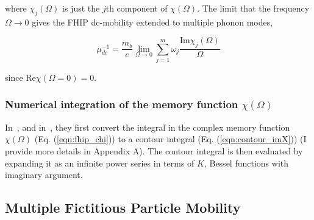 where $\chi_j(\Omega)$ is just the $j$th component of $\chi(\Omega)$. The limit that the frequency $\Omega \rightarrow 0$ gives the FHIP dc-mobility extended to multiple phonon modes,

\begin{equation}
    \mu^{-1}_{dc} = \frac{m_b}{e}\lim_{\Omega \rightarrow 0} \sum_{j=1}^m \omega_j \frac{\textrm{Im}\chi_j(\Omega)}{\Omega}
\end{equation}

since $\textrm{Re}\chi(\Omega = 0) = 0$.

\subsubsection{Numerical integration of the memory function $\chi(\Omega)$}

In~\cite{feynman_mobility_1962}, and in~\cite{devreese_optical_1972}, they first convert the integral in the complex memory function $\chi(\Omega)$ (Eq. (\ref{eqn:fhip_chi})) to a contour integral (Eq. (\ref{eqn:contour_imX})) (I provide more details in Appendix A). The contour integral is then evaluated by expanding it as an infinite power series in terms of $K$, Bessel functions with imaginary argument. 


\subsection{Multiple Fictitious Particle Mobility}

